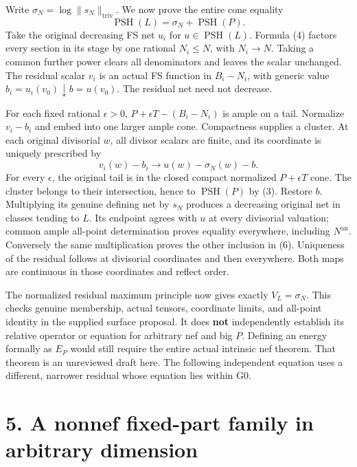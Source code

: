 \documentclass[
  10pt,
]{article}
\begin{document}
Write \(\sigma_N=\log\|s_N\|_{\mathrm{triv}}\). We now prove the entire
cone equality
\[\operatorname{PSH}(L)=\sigma_N+\operatorname{PSH}(P).               \tag{6}\]
Take the original decreasing FS net \(u_i\) for
\(u\in\operatorname{PSH}(L)\). Formula (4) factors every section in its
stage by one rational \(N_i\le N\), with \(N_i\to N\). Taking a common
further power clears all denominators and leaves the scalar unchanged.
The residual scalar \(v_i\) is an actual FS function in \(B_i-N_i\),
with generic value \(b_i=u_i(v_0)\downarrow b=u(v_0)\). The residual net
need not decrease.

For each fixed rational \(\epsilon>0\), \(P+\epsilon T-(B_i-N_i)\) is
ample on a tail. Normalize \(v_i-b_i\) and embed into one larger ample
cone. Compactness supplies a cluster. At each original divisorial \(w\),
all divisor scalars are finite, and its coordinate is uniquely
prescribed by \[v_i(w)-b_i\longrightarrow u(w)-\sigma_N(w)-b.\] For
every \(\epsilon\), the original tail is in the closed compact
normalized \(P+\epsilon T\) cone. The cluster belongs to their
intersection, hence to \(\operatorname{PSH}(P)\) by (3). Restore \(b\).
Multiplying its genuine defining net by \(s_N\) produces a decreasing
original net in classes tending to \(L\). Its endpoint agrees with \(u\)
at every divisorial valuation; common ample all-point determination
proves equality everywhere, including \(N^{\mathrm{an}}\). Conversely
the same multiplication proves the other inclusion in (6). Uniqueness of
the residual follows at divisorial coordinates and then everywhere. Both
maps are continuous in those coordinates and reflect order.

The normalized residual maximum principle now gives exactly
\(V_L=\sigma_N\). This checks genuine membership, actual tensors,
coordinate limits, and all-point identity in the supplied surface
proposal. It does \textbf{not} independently establish its relative
operator or equation for arbitrary nef and big \(P\). Defining an energy
formally as \(E_P\) would still require the entire actual intrinsic nef
theorem. That theorem is an unreviewed draft here. The following
independent equation uses a different, narrower residual whose equation
lies within G0.

\section{5. A nonnef fixed-part family in arbitrary
dimension}\label{a-nonnef-fixed-part-family-in-arbitrary-dimension}
\end{document}
